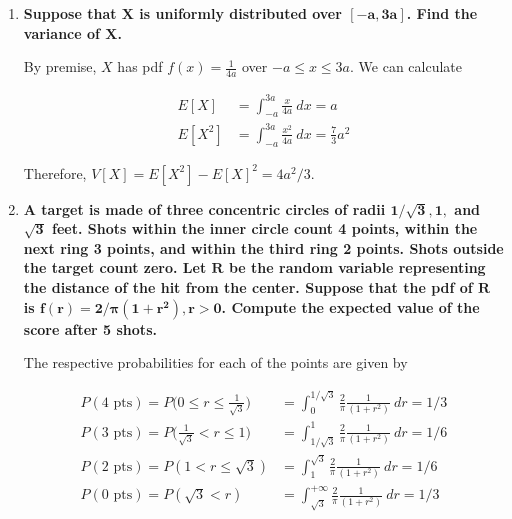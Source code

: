 \documentclass[10pt, oneside]{article}   	%
\theoremstyle{definition}
\begin{document}
\begin{enumerate}[label=7.\arabic*]
\item  \begin{tcolorbox}[
  colback=Cerulean!5!white,
  colframe=Cerulean!75!black]
  \textbf{Suppose that $\bm{X}$ is uniformly distributed over $\bm{[-a, 3a]}$. Find the variance of $\bm{X}$.}
  \end{tcolorbox}
  
  By premise, $X$ has pdf $f(x) = \frac{1}{4a}$ over $-a \leq x \leq 3a$. We can calculate
  
  \begin{align*}
  E[X] &= \int^{3a}_{-a} \frac{x}{4a} \ dx = a \\
  E[X^2] &= \int^{3a}_{-a} \frac{x^2}{4a}\ dx = \frac{7}{3} a^2
  \end{align*}
  
  Therefore, $V[X] = E[X^2] - E[X]^2 = \boxed{4a^2 / 3}$.
  
\item  \begin{tcolorbox}[
  colback=Cerulean!5!white,
  colframe=Cerulean!75!black]
  \textbf{A target is made of three concentric circles of radii $\bm{1/ \sqrt{3}}, \bm{1},$ and $\bm{\sqrt{3}}$ feet. Shots within the inner circle count 4 points, within the next ring 3 points, and within the third ring 2 points. Shots outside the target count zero. Let $\bm{R}$ be the random variable representing the distance of the hit from the center. Suppose that the pdf of $\bm{R}$ is $\bm{f(r) = 2 / \pi (1+r^2), r > 0}$. Compute the expected value of the score after 5 shots.}
  \end{tcolorbox}
  
  The respective probabilities for each of the points are given by
  
  \begin{align*}
  P(\text{4 pts}) = P\Bigg( 0 \leq r \leq \frac{1}{\sqrt{3}} \Bigg) &= \int^{1/\sqrt{3}}_0 \frac{2}{\pi} \frac{1}{(1+r^2)} \ dr = \boxed{1/3} \\
  P(\text{3 pts}) = P\Bigg( \frac{1}{\sqrt{3}} < r \leq 1 \Bigg) &= \int^{1}_{1/\sqrt{3}} \frac{2}{\pi} \frac{1}{(1+r^2)} \ dr = \boxed{1/6} \\
  P(\text{2 pts}) = P( 1 < r \leq \sqrt{3} ) &= \int^{\sqrt{3}}_{1} \frac{2}{\pi} \frac{1}{(1+r^2)} \ dr = \boxed{1/6} \\
  P(\text{0 pts}) = P( \sqrt{3} < r ) &= \int^{+\infty}_{\sqrt{3}} \frac{2}{\pi} \frac{1}{(1+r^2)} \ dr = \boxed{1/3} 
  \end{align*}
  

\end{enumerate}
\end{document}
